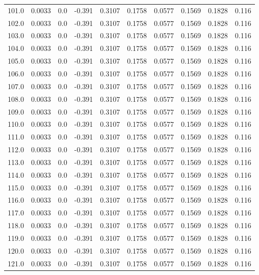 \begin{longtable}{lrrrrrrrrr}
101.0 & 0.0033 & 0.0 & -0.391 & 0.3107 & 0.1758 & 0.0577 & 0.1569 & 0.1828 & 0.116 \\
102.0 & 0.0033 & 0.0 & -0.391 & 0.3107 & 0.1758 & 0.0577 & 0.1569 & 0.1828 & 0.116 \\
103.0 & 0.0033 & 0.0 & -0.391 & 0.3107 & 0.1758 & 0.0577 & 0.1569 & 0.1828 & 0.116 \\
104.0 & 0.0033 & 0.0 & -0.391 & 0.3107 & 0.1758 & 0.0577 & 0.1569 & 0.1828 & 0.116 \\
105.0 & 0.0033 & 0.0 & -0.391 & 0.3107 & 0.1758 & 0.0577 & 0.1569 & 0.1828 & 0.116 \\
106.0 & 0.0033 & 0.0 & -0.391 & 0.3107 & 0.1758 & 0.0577 & 0.1569 & 0.1828 & 0.116 \\
107.0 & 0.0033 & 0.0 & -0.391 & 0.3107 & 0.1758 & 0.0577 & 0.1569 & 0.1828 & 0.116 \\
108.0 & 0.0033 & 0.0 & -0.391 & 0.3107 & 0.1758 & 0.0577 & 0.1569 & 0.1828 & 0.116 \\
109.0 & 0.0033 & 0.0 & -0.391 & 0.3107 & 0.1758 & 0.0577 & 0.1569 & 0.1828 & 0.116 \\
110.0 & 0.0033 & 0.0 & -0.391 & 0.3107 & 0.1758 & 0.0577 & 0.1569 & 0.1828 & 0.116 \\
111.0 & 0.0033 & 0.0 & -0.391 & 0.3107 & 0.1758 & 0.0577 & 0.1569 & 0.1828 & 0.116 \\
112.0 & 0.0033 & 0.0 & -0.391 & 0.3107 & 0.1758 & 0.0577 & 0.1569 & 0.1828 & 0.116 \\
113.0 & 0.0033 & 0.0 & -0.391 & 0.3107 & 0.1758 & 0.0577 & 0.1569 & 0.1828 & 0.116 \\
114.0 & 0.0033 & 0.0 & -0.391 & 0.3107 & 0.1758 & 0.0577 & 0.1569 & 0.1828 & 0.116 \\
115.0 & 0.0033 & 0.0 & -0.391 & 0.3107 & 0.1758 & 0.0577 & 0.1569 & 0.1828 & 0.116 \\
116.0 & 0.0033 & 0.0 & -0.391 & 0.3107 & 0.1758 & 0.0577 & 0.1569 & 0.1828 & 0.116 \\
117.0 & 0.0033 & 0.0 & -0.391 & 0.3107 & 0.1758 & 0.0577 & 0.1569 & 0.1828 & 0.116 \\
118.0 & 0.0033 & 0.0 & -0.391 & 0.3107 & 0.1758 & 0.0577 & 0.1569 & 0.1828 & 0.116 \\
119.0 & 0.0033 & 0.0 & -0.391 & 0.3107 & 0.1758 & 0.0577 & 0.1569 & 0.1828 & 0.116 \\
120.0 & 0.0033 & 0.0 & -0.391 & 0.3107 & 0.1758 & 0.0577 & 0.1569 & 0.1828 & 0.116 \\
121.0 & 0.0033 & 0.0 & -0.391 & 0.3107 & 0.1758 & 0.0577 & 0.1569 & 0.1828 & 0.116 \\

\end{longtable}

